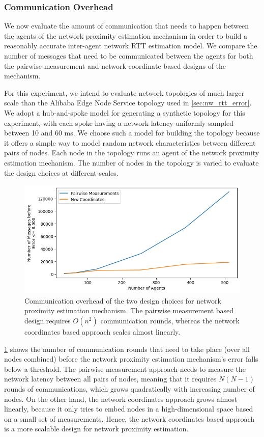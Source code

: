 \subsubsection{Communication Overhead}
We now evaluate the amount of communication that needs to happen between the agents of the network proximity estimation mechanism in order to build a reasonably accurate inter-agent network RTT estimation model. We compare the number of messages that need to be communicated between the agents for both the pairwise measurement and network coordinate based designs of the mechanism. 
\par For this experiment, we intend to evaluate network topologies of much larger scale than the Alibaba Edge Node Service topology used in \cref{sec:nw_rtt_error}. We adopt a hub-and-spoke model for generating a synthetic topology for this experiment, with each spoke having a network latency uniformly sampled between 10 and 60 ms. We choose such a model for building the topology because it offers a simple way to model random network characteristics between different pairs of nodes. Each node in the topology runs an agent of the network proximity estimation mechanism. The number of nodes in the topology is varied to evaluate the design choices at different scales.
\begin{figure}
\centering
\includegraphics[width=0.75\linewidth]{figures/design_space/nw_prox/comm_overhead.png}
\caption{Communication overhead of the two design choices for network proximity estimation mechanism. The pairwise measurement based design requires $O \left( n^2 \right)$ communication rounds, whereas the network coordinates based approach scales almost linearly.}
\label{fig:comm_overhead}
\end{figure}

\par \cref{fig:comm_overhead} shows the number of communication rounds that need to take place (over all nodes combined) before the network proximity estimation mechanism's error falls below a threshold. The pairwise measurement approach needs to measure the network latency between all pairs of nodes, meaning that it requires $N \left( N - 1 \right)$ rounds of communications, which grows quadratically with increasing number of nodes. On the other hand, the network coordinates approach grows almost linearly, because it only tries to embed nodes in a high-dimensional space based on a small set of measurements. Hence, the network coordinates based approach is a more scalable design for network proximity estimation.

